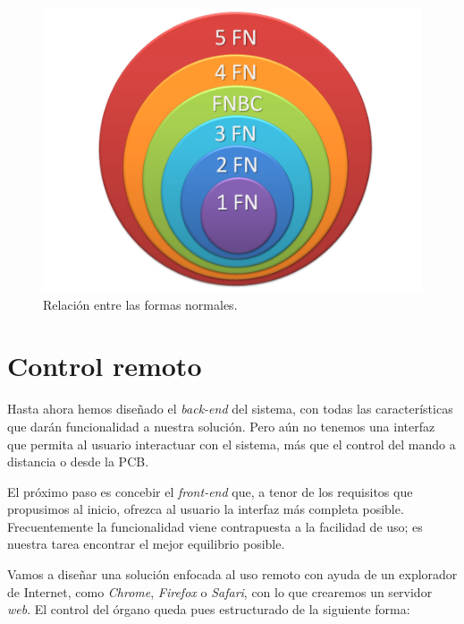 \begin{figure}[H]
	\noindent \begin{centering}
		\includegraphics[width=\linewidth/2]{capitulo4/bd_fn}
		\par\end{centering}
	\smallskip
	\caption[Relación entre las formas normales.]{\label{fig:bd_fn} Relación entre las formas normales. \cite{wiki_normal}}
\end{figure} 

\smallskip

\section{Control remoto}

Hasta ahora hemos diseñado el \textit{back-end} del sistema, con todas las características que darán funcionalidad a nuestra solución. Pero aún no tenemos una interfaz que permita al usuario interactuar con el sistema, más que el control del mando a distancia o desde la \acrshort{PCB}.

El próximo paso es concebir el \textit{front-end} que, a tenor de los requisitos que propusimos al inicio, ofrezca al usuario la interfaz más completa posible. Frecuentemente la funcionalidad viene contrapuesta a la facilidad de uso; es nuestra tarea encontrar el mejor equilibrio posible.

Vamos a diseñar una solución enfocada al uso remoto con ayuda de un explorador de Internet, como \textit{Chrome}, \textit{Firefox} o \textit{Safari}, con lo que crearemos un servidor \textit{web}. El control del órgano queda pues estructurado de la siguiente forma:

